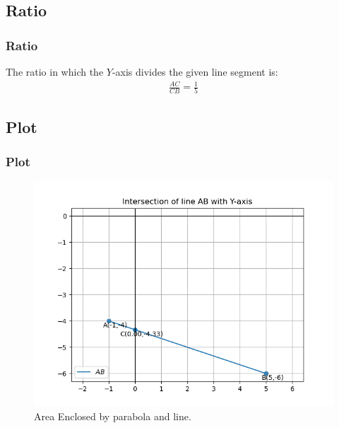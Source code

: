 \documentclass{beamer}
\theoremstyle{remark}
\numberwithin{equation}{section}
\begin{document}
\subsection{Ratio}
\begin{frame}
\frametitle{Ratio}
The ratio in which the $Y$-axis divides the given line segment is:\\
\begin{align}
    {\frac{AC}{CB}}=\frac{1}{5}
\end{align}
\end{frame}

\subsection{Plot}
\begin{frame}[fragile]
\frametitle{Plot}
\begin{figure}[h!]
   \centering
   \includegraphics[width=0.9\linewidth]{figs/plot.png}
	\caption{Area Enclosed by parabola and line. }
   \label{stemplot}
\end{figure}
\end{frame}
\end{document}
